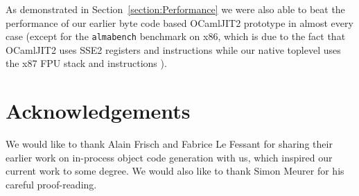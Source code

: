 \documentclass[10pt,a4paper,final,twocolumn]{article}
\begin{document}
As demonstrated in Section~\ref{section:Performance} we were also able to beat the performance of
our earlier byte code based OCamlJIT2 prototype in almost every case (except for the \texttt{almabench}
benchmark on x86, which is due to the fact that OCamlJIT2 uses SSE2 registers and instructions while
our native toplevel uses the x87 FPU stack and instructions \cite{Meurer10jit}).


\section*{Acknowledgements} \label{section:Acknowledgements}

We would like to thank Alain Frisch and Fabrice Le Fessant for sharing their earlier work on
in-process object code generation with us, which inspired our current work to some degree.
We would also like to thank Simon Meurer for his careful proof-reading.




\end{document}
